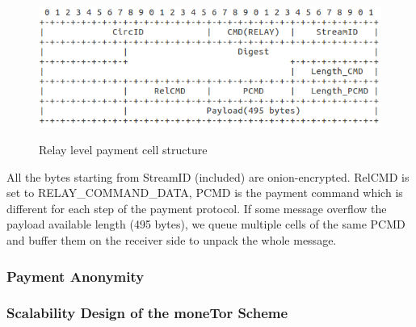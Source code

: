 \begin{figure}[h]
	\centering
	\includegraphics[scale=0.38]{images/payment_cell_header.png}
	\label{fig:relay_command_mt_structure}
	\caption{Relay level payment cell structure}
\end{figure}

All the bytes starting from StreamID (included) are onion-encrypted. RelCMD is set to RELAY\_COMMAND\_DATA, PCMD is the payment command which is different for each step of the payment protocol. If some message overflow the payload available length (495 bytes), we queue multiple cells of the same PCMD and buffer them on the receiver side to unpack the whole message.

\subsubsection{Payment Anonymity}


\subsubsection{Scalability Design of the moneTor Scheme}

